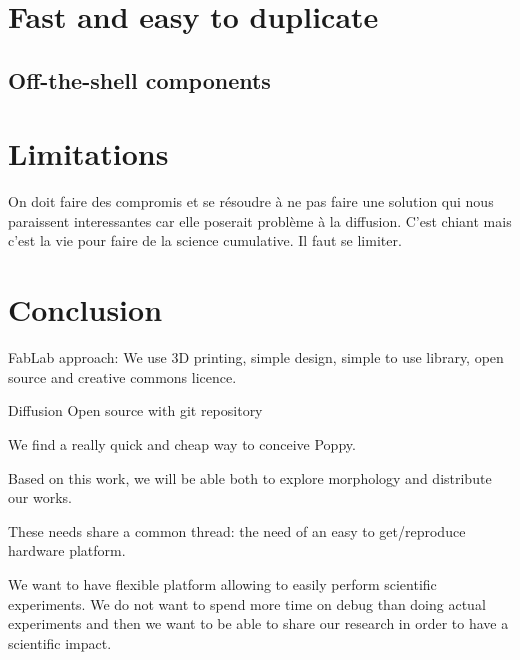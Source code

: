 \section{Fast and easy to duplicate} %

\subsection{Off-the-shell components} %


\section{Limitations} %

On doit faire des compromis et se résoudre à ne pas faire une solution qui  nous paraissent interessantes car elle poserait problème à la diffusion.
C'est chiant mais c'est la vie pour faire de la science cumulative.
Il faut se limiter.


\section{Conclusion} %

FabLab approach: We use 3D printing, simple design, simple to use library, open source and creative commons licence.

Diffusion Open source with git repository

We find a really quick and cheap way to conceive Poppy.

Based on this work, we will be able both to explore morphology and distribute our works.

These needs share a common thread: the need of an easy to get/reproduce hardware platform.

We want to have flexible platform allowing to easily perform scientific experiments.
We do not want to spend more time on debug than doing actual experiments and then we want to be able to share our research in order to have a scientific impact.



